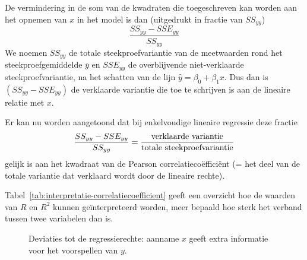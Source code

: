 De vermindering in de som van de kwadraten die toegeschreven kan worden aan het opnemen van $x$ in het model is dan (uitgedrukt in fractie van $SS_{yy}$)
\[ \frac{SS_{yy} - SSE_{yy}}{SS_{yy}} \]
We noemen $SS_{yy}$ de totale steekproefvariantie van de meetwaarden rond het steekproefgemiddelde $\overline{y}$ en $SSE_{yy}$ de overblijvende niet-verklaarde steekproefvariantie, na het schatten van de lijn $\widehat{y} = \beta_{0} + \beta_{1}x$. Dus dan is $(SS_{yy} - SSE_{yy})$ de verklaarde variantie die toe te schrijven is aan de lineaire relatie met $x$.

Er kan nu worden aangetoond dat bij enkelvoudige lineaire regressie deze fractie
\[ \frac{SS_{yy} - SSE_{yy}}{SS_{yy}} = \frac{\textnormal{verklaarde variantie}}{\textnormal{totale steekproefvariantie}} \]
gelijk is aan het kwadraat van de Pearson correlatieco\"effici\"ent  (= het deel van de totale variantie dat verklaard wordt door de lineaire rechte).

Tabel~\ref{tab:interpretatie-correlatiecoefficient} geeft een overzicht hoe de waarden van $R$ en $R^2$ kunnen geïnterpreteerd worden, meer bepaald hoe sterk het verband tussen twee variabelen dan is.

\begin{figure}
  \caption{Deviaties tot de regressierechte: aanname $x$ geeft extra informatie voor het voorspellen van $y$.}
	\label{fig:rendierenFiguur2}
\end{figure}

